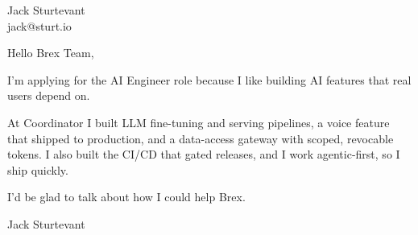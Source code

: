 \documentclass[11pt]{article}
\begin{document}
\raggedright

{\namefont\fontsize{20pt}{24pt}\selectfont Jack Sturtevant}\\[-0.3em]
jack@sturt.io

\vspace{1.2em}

Hello Brex Team,

I'm applying for the AI Engineer role because I like building AI features that real users depend on.

At Coordinator I built LLM fine-tuning and serving pipelines, a voice feature that shipped to production, and a data-access gateway with scoped, revocable tokens. I also built the CI/CD that gated releases, and I work agentic-first, so I ship quickly.

I'd be glad to talk about how I could help Brex.

\vspace{0.6em}
Jack Sturtevant
\end{document}
